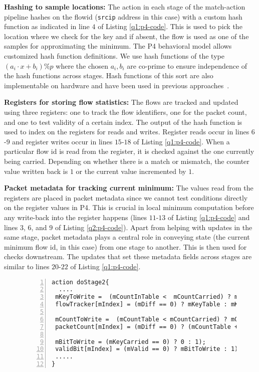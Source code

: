  \noindent \textbf{Hashing to sample locations:} The action in each stage of the match-action pipeline  hashes on the flowid (\texttt{srcip} address in this case) with a custom hash function as indicated in line $4$ of Listing \ref{q1:p4-code}. This is used to pick the location where we check for the key and if absent, the flow is used as one of the samples for approximating the minimum. The P4 behavioral model \cite{p4-bm} allows customized hash function definitions. We use hash functions of the type $(a_i\cdot x + b_i)\%p$ where the chosen $a_i, b_i$ are co-prime to ensure independence of the hash functions across stages. Hash functions of this sort are also implementable on hardware and have been used in previous approaches~\cite{univmon,li2016flowradar}. 

\noindent \textbf{Registers for storing flow statistics:} The flows are tracked and updated using three registers: one to track the flow identifiers, one for the packet count, and one to test validity of a certain index. The output of the hash function is used to index on the registers for reads and writes. Register reads occur in lines $6$-$9$ and register writes occur in lines $15$-$18$ of Listing \ref{q1:p4-code}. When a particular flow id is read from the register, it is checked against the one currently being carried. Depending on whether there is a match or mismatch, the counter value written back is $1$ or the current value incremented by $1$. 

\noindent \textbf{Packet metadata for tracking current minimum:} The values read from the registers are placed in packet metadata since we cannot test conditions directly on the register values in P4. This is crucial in local minimum computation before any write-back into the register happens (lines $11$-$13$ of Listing \ref{q1:p4-code} and lines $3$, $6$, and $9$ of Listing \ref{q2:p4-code}). Apart from helping with updates in the same stage, packet metadata plays a central role in conveying state (the current minimum flow id, in this case) from one stage to another. This is then used for checks downstream. The updates that set these metadata fields across stages are similar to lines $20$-$22$ of Listing \ref{q1:p4-code}.

\begin{figure}
 \begin{lstlisting}[basicstyle=\footnotesize, caption=
Second HashPipe stage with rolling minimum. Fields prefixed with m are metadata fields, label=q2:p4-code, captionpos=b, basicstyle=\footnotesize, breaklines=true,
numbers=left, xleftmargin=2em,frame=single,framexleftmargin=2.0em]
action doStage2{
  ....
 mKeyToWrite =  (mCountInTable <  mCountCarried) ? mKeyCarried : mKeyTable));
 flowTracker[mIndex] = (mDiff == 0) ? mKeyTable : mKeyToWrite;

 mCountToWrite =  (mCountTable < mCountCarried) ? mCountCarried : mCountTable;
 packetCount[mIndex] = (mDiff == 0) ? (mCountTable + mCountCarried) :  mCountToWrite;

 mBitToWrite = (mKeyCarried == 0) ? 0 : 1);
 validBit[mIndex] = (mValid == 0) ? mBitToWrite : 1);
 .....
}
\end{lstlisting}
\end{figure}


